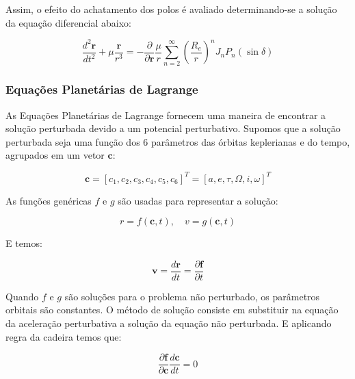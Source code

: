 \par Assim, o efeito do achatamento dos polos é avaliado determinando-se a solução da equação diferencial abaixo:

\begin{equation}
\frac{d^2\mathbf{r}}{dt^2} + \mu \frac{\mathbf{r}}{r^3} = -\frac{\partial}{\partial\mathbf{r}} \frac{\mu}{r} \sum\limits_{n=2}^{\infty} \left(\frac{R_e}{r}\right)^n J_n P_n(\sin\delta)
\label{eq:8L}
\end{equation}

\subsubsection{Equações Planetárias de Lagrange}

\par As Equações Planetárias de Lagrange fornecem uma maneira de encontrar a solução perturbada devido a um potencial perturbativo. Supomos que a solução perturbada seja uma função dos 6 parâmetros das órbitas keplerianas e do tempo, agrupados em um vetor $\mathbf{c}$:

\begin{equation}
\mathbf{c}=[c_1,c_2,c_3,c_4,c_5,c_6]^T=[a,e,\tau,\Omega,i,\omega]^T
\label{eq:9L}
\end{equation}

\par As funções genéricas $f$ e $g$ são usadas para representar a solução:

\begin{equation}
r = f(\mathbf{c}, t), \quad v = g(\mathbf{c}, t)
\label{eq:10L}
\end{equation}

\par E temos:

\begin{equation}
\mathbf{v}=\frac{d\mathbf{r}}{dt}=\frac{\partial\mathbf{f}}{\partial t}
\label{eq:11L}
\end{equation}

\par Quando $f$ e $g$ são soluções para o problema não perturbado, os parâmetros orbitais são constantes. O método de solução consiste em substituir na equação da aceleração perturbativa a solução da equação não perturbada. E aplicando  regra da cadeira temos que:

\begin{equation}
\frac{\partial\mathbf{f}}{\partial\mathbf{c}}\frac{d\mathbf{c}}{dt}=0
\label{eq:12L}
\end{equation}

